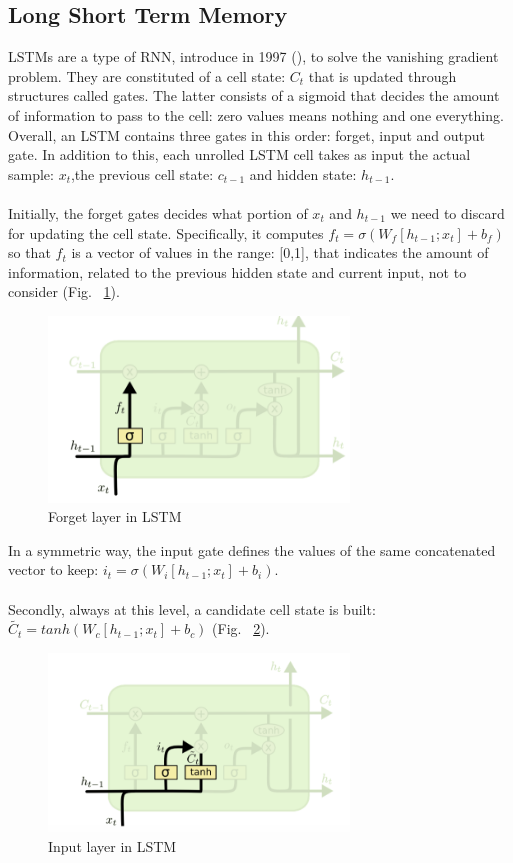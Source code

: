 \documentclass[LaM,binding=0.6cm]{sapthesis}
\begin{document}
\subsection{Long Short Term Memory}
LSTMs are a type of RNN, introduce in 1997 (\cite{lstmop}), to solve the vanishing gradient problem. They are constituted of a cell state: $C_t$ that is updated through structures called gates. The latter consists of a sigmoid that decides the amount of information to pass to the cell: zero values means nothing and one everything. Overall, an LSTM contains three gates in this order: forget, input and output gate. In addition to this, each unrolled LSTM cell takes as input the actual sample: $x_t$,the previous cell state: $c_{t-1}$ and hidden state: $h_{t-1}$.\\\\Initially, the forget gates decides what portion of $x_t$ and $h_{t-1}$ we need to discard for updating the cell state. Specifically, it computes $f_t=\sigma\left(W_f[h_{t-1};x_t]+b_f\right)$ so that $f_t$ is a vector of values in the range: [0,1], that indicates the amount of information, related to the  previous hidden state and current input, not to consider (Fig. ~\ref{fig:lstms1}).
\begin{figure}   \centering
    \includegraphics[width=80mm,scale=0.7]{lstms1}
    \caption{Forget layer in LSTM \cite{lstmsite}}
    \label{fig:lstms1}
\end{figure}
In a symmetric way, the input gate defines the values of the same concatenated vector to keep: $i_t=\sigma\left(W_i[h_{t-1};x_t]+b_i\right)$.\\\\Secondly, always at this level, a candidate cell state is built: $\widetilde{C_t}=tanh\left(W_c[h_{t-1};x_t]+b_c\right)$ (Fig. ~\ref{fig:lstms2}).
\begin{figure}   \centering
    \includegraphics[width=80mm,scale=0.7]{lstms2}
    \caption{Input layer in LSTM \cite{lstmsite}}
    \label{fig:lstms2}
\end{figure}
\end{document}
